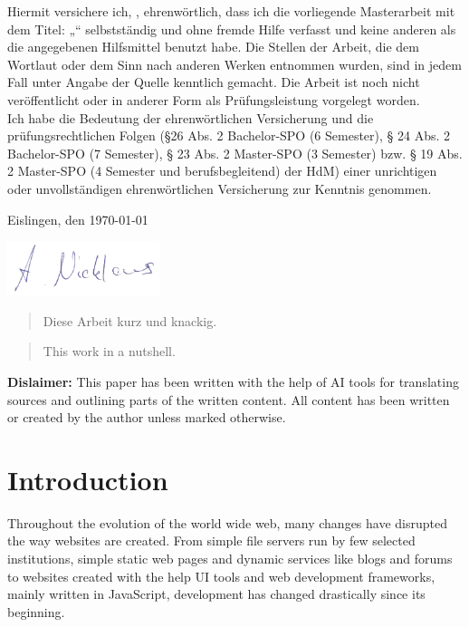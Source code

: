 \documentclass[a4paper, fontsize=11pt]{article}
\makeatletter
\let\Title\@title
\let\Author\@author
\makeatother
\begin{document}
	Hiermit versichere ich, \Author, ehrenwörtlich, dass ich die
	vorliegende Masterarbeit mit dem Titel: „\Title“ selbstständig und ohne fremde Hilfe verfasst und keine
	anderen als die angegebenen Hilfsmittel benutzt habe. Die Stellen der Arbeit, die dem
	Wortlaut oder dem Sinn nach anderen Werken entnommen wurden, sind in jedem Fall
	unter Angabe der Quelle kenntlich gemacht. Die Arbeit ist noch nicht veröffentlicht oder
	in anderer Form als Prüfungsleistung vorgelegt worden.\\
	
	Ich habe die Bedeutung der ehrenwörtlichen Versicherung und die prüfungsrechtlichen
	Folgen (§26 Abs. 2 Bachelor-SPO (6 Semester), § 24 Abs. 2 Bachelor-SPO (7 Semester), §
	23 Abs. 2 Master-SPO (3 Semester) bzw. § 19 Abs. 2 Master-SPO (4 Semester und
	berufsbegleitend) der HdM) einer unrichtigen oder unvollständigen ehrenwörtlichen
	Versicherung zur Kenntnis genommen.
	\vspace{30px}
	
	Eislingen, den \today
	\vspace{20px}
	
	\includegraphics[height=60px]{img/unterschrift.png}
	\vspace{10px}
	
	\Author

\pagebreak

\begin{abstract}
  Diese Arbeit kurz und knackig.
\end{abstract}

\begin{abstract}
  This work in a nutshell.
\end{abstract}

\vfill

\noindent\textbf{Dislaimer:} This paper has been written with the help of AI tools for translating sources and outlining parts of the written content.
All content has been written or created by the author unless marked otherwise.

\pagebreak

\tableofcontents
\pagebreak

\section{Introduction}\label{sec:introduction}
Throughout the evolution of the world wide web, many changes have disrupted the way websites are created.
From simple file servers run by few selected institutions, simple static web pages and dynamic services like blogs and forums to websites created with the help UI tools and web development frameworks, mainly written in JavaScript, development has changed drastically since its beginning.
\end{document}
